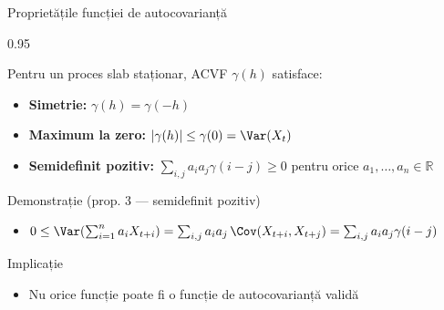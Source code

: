\documentclass[9pt, aspectratio=169, t]{beamer}
\begin{document}
\begin{frame}{Proprietățile funcției de autocovarianță}
    \begin{cminipage}{0.95\textwidth}
        \small
        \begin{prop}
            Pentru un proces slab staționar, ACVF $\gamma(h)$ satisface:
            \begin{itemize}\setlength{\itemsep}{0pt}
                \item \textbf{Simetrie:} $\gamma(h) = \gamma(-h)$
                \item \textbf{Maximum la zero:} $|\gamma(h)| \leq \gamma(0) = \Var(X_t)$
                \item \textbf{Semidefinit pozitiv:} $\sum_{i,j} a_i a_j \gamma(i - j) \geq 0$ pentru orice $a_1, \ldots, a_n \in \mathbb{R}$
            \end{itemize}
        \end{prop}

        \begin{alertblock}{Demonstrație (prop. 3 --- semidefinit pozitiv)}
            \begin{itemize}\setlength{\itemsep}{0pt}
                \item {\footnotesize $0 \leq \Var\!\left(\sum_{i=1}^n a_i X_{t+i}\right) = \sum_{i,j} a_i a_j \,\Cov(X_{t+i}, X_{t+j}) = \sum_{i,j} a_i a_j \gamma(i-j)$}
            \end{itemize}
        \end{alertblock}

        \begin{exampleblock}{Implicație}
            \begin{itemize}\setlength{\itemsep}{0pt}
                \item Nu orice funcție poate fi o funcție de autocovarianță validă
            \end{itemize}
        \end{exampleblock}
    \end{cminipage}
\end{frame}
\end{document}
